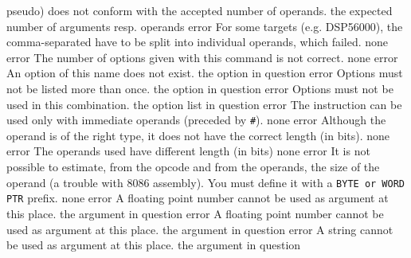 \documentclass[12pt,twoside]{report}
\newcommand{\tty}[1]{{\tt #1}}
\begin{document}
\begin{description}
{                pseudo) does not conform with the accepted number of
                operands.}
               {the expected number of arguments resp. operands}
               {error}
               {For some targets (e.g. DSP56000), the
                comma-separated have to be split into individual
                operands, which failed.}
               {none}
               {error}
               {The number of options given with this command is not
                correct.}
               {none}
               {error}
               {An option of this name does not exist.}
               {the option in question}
               {error}
               {Options must not be listed more than once.}
               {the option in question}
               {error}
               {Options must not be used in this combination.}
               {the option list in question}
               {error}
               {The instruction can be used only with immediate operands
                (preceded by \tty{\#}).}
               {none}
               {error}
               {Although the operand is of the right type, it does not have
                the correct length (in bits).}
               {none}
               {error}
               {The operands used have different length (in bits)}
               {none}
               {error}
               {It is not possible to estimate, from the opcode and from
                the operands, the size of the operand (a trouble with
                8086 assembly). You must define it with a \tty{BYTE or WORD}
                \tty{PTR} prefix.}
               {none}
               {error}
               {A floating point number cannot be used as argument at this place.}
               {the argument in question}
               {error}
               {A floating point number cannot be used as argument at this place.}
               {the argument in question}
               {error}
               {A string cannot be used as argument at this place.}
               {the argument in question}

\end{description}
\end{document}
